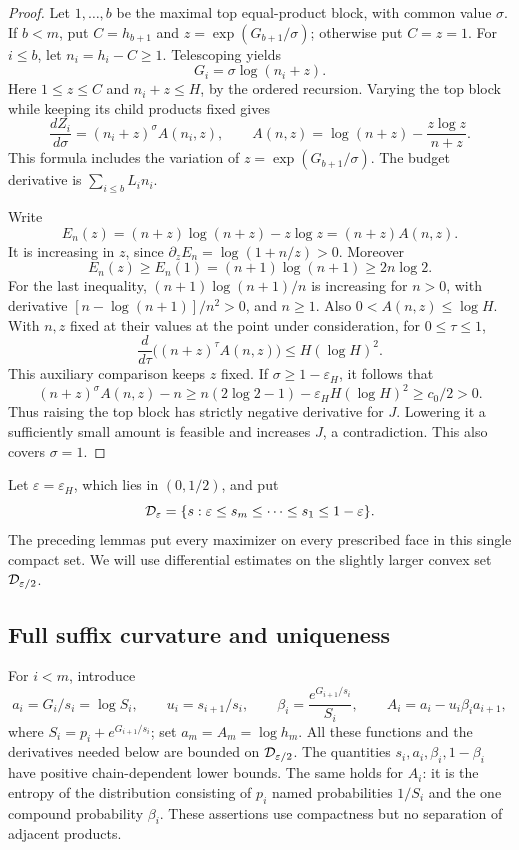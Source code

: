 \begin{proof}
Let \(1,\ldots,b\) be the maximal top equal-product block, with
common value \(\sigma\).  If \(b<m\), put
\(C=h_{b+1}\) and \(z=\exp(G_{b+1}/\sigma)\); otherwise put \(C=z=1\).
For \(i\le b\), let \(n_i=h_i-C\ge1\).  Telescoping yields
\[
 G_i=\sigma\log(n_i+z).
\]
Here \(1\le z\le C\) and \(n_i+z\le H\), by the ordered recursion.
Varying the top block while keeping its child products fixed gives
\begin{equation}
 \frac{dZ_i}{d\sigma}=(n_i+z)^\sigma A(n_i,z),\qquad
 A(n,z)=\log(n+z)-\frac{z\log z}{n+z}.             \label{geom:eq:topderivative}
\end{equation}
This formula includes the variation of \(z=\exp(G_{b+1}/\sigma)\).
The budget derivative is \(\sum_{i\le b}L_i n_i\).

Write
\[
 E_n(z)=(n+z)\log(n+z)-z\log z=(n+z)A(n,z).
\]
It is increasing in \(z\), since \(\partial_zE_n=\log(1+n/z)>0\).
Moreover
\[
 E_n(z)\ge E_n(1)=(n+1)\log(n+1)\ge2n\log2.
\]
For the last inequality,
\((n+1)\log(n+1)/n\) is increasing for \(n>0\), with derivative
\([n-\log(n+1)]/n^2>0\), and \(n\ge1\).
Also \(0<A(n,z)\le\log H\).  With \(n,z\) fixed at their values
at the point under consideration, for \(0\le\tau\le1\),
\[
 \frac{d}{d\tau}\bigl((n+z)^\tau A(n,z)\bigr)
 \le H(\log H)^2.
\]
This auxiliary comparison keeps \(z\) fixed.
If \(\sigma\ge1-\varepsilon_H\), it follows that
\[
 (n+z)^\sigma A(n,z)-n
 \ge n(2\log2-1)-\varepsilon_HH(\log H)^2
 \ge c_0/2>0.
\]
Thus raising the top block has strictly negative derivative for \(J\).
Lowering it a sufficiently small amount is feasible and increases
\(J\), a contradiction.  This also covers \(\sigma=1\).
\end{proof}

Let \(\varepsilon=\varepsilon_H\), which lies in \((0,1/2)\), and put
\[
 \mathcal D_\varepsilon
   =\{s:\varepsilon\le s_m\le\cdots\le s_1\le1-\varepsilon\}.
\]
The preceding lemmas put every maximizer on every prescribed face in
this single compact set.  We will use differential estimates on the
slightly larger convex set \(\mathcal D_{\varepsilon/2}\).

\subsection{Full suffix curvature and uniqueness}

For \(i<m\), introduce
\[
 a_i=G_i/s_i=\log S_i,\qquad
 u_i=s_{i+1}/s_i,\qquad
 \beta_i=\frac{e^{G_{i+1}/s_i}}{S_i},\qquad
 A_i=a_i-u_i\beta_i a_{i+1},
\]
where \(S_i=p_i+e^{G_{i+1}/s_i}\); set
\(a_m=A_m=\log h_m\).
All these functions and the derivatives needed below are bounded on
\(\mathcal D_{\varepsilon/2}\).  The quantities \(s_i,a_i,\beta_i,1-\beta_i\)
have positive chain-dependent lower bounds.  The same holds for \(A_i\):
it is the entropy of the distribution consisting of \(p_i\) named
probabilities \(1/S_i\) and the one compound probability \(\beta_i\).
These assertions use compactness but no separation of adjacent products.

